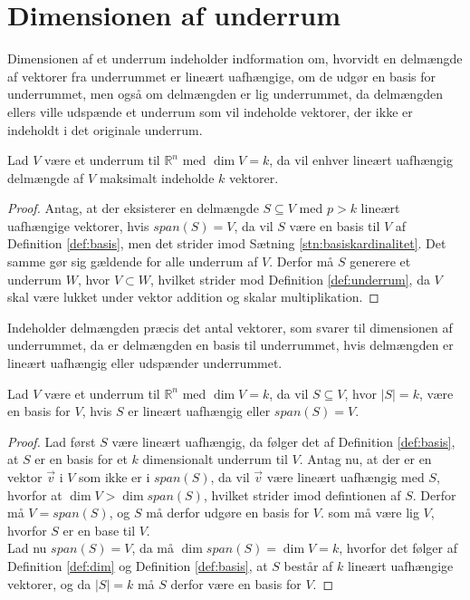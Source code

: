 \section{Dimensionen af underrum}
Dimensionen af et underrum indeholder indformation om, hvorvidt en delmængde af vektorer fra underrummet er lineært uafhængige, om de udgør en basis for underrummet, men også om delmængden er lig underrummet,
da delmængden ellers ville udspænde et underrum som vil indeholde vektorer, der ikke er indeholdt i det originale underrum.
\begin{kor}
Lad $V$ være et underrum til $\mathds{R}^n$ med $\dim{V}=k$, da vil enhver lineært uafhængig delmængde af $V$ maksimalt indeholde $k$ vektorer.
\label{kor:linearuafhangighedunderrum}
\end{kor}
\begin{proof}
Antag, at der eksisterer en delmængde $S \subseteq V$ med $p > k$ lineært uafhængige vektorer, hvis $span(S) = V$, da vil $S$ være en basis til $V$ af Definition \ref{def:basis}, men det strider imod Sætning \ref{stn:basiskardinalitet}. Det samme gør sig gældende for alle underrum af $V$.
Derfor må $S$ generere et underrum $W$, hvor $V \subset W$, hvilket strider mod Definition \ref{def:underrum}, da $V$ skal være lukket under vektor addition og skalar multiplikation.
\end{proof}
Indeholder delmængden præcis det antal vektorer, som svarer til dimensionen af underrummet, da er delmængden en basis til underrummet, hvis delmængden er lineært uafhængig eller udspænder underrummet.
\begin{kor}
Lad $V$ være et underrum til $\mathds{R}^n$ med $\dim{V}=k$, da vil $S \subseteq V$, hvor $|S|=k$, være en basis for $V$, hvis $S$ er lineært uafhængig eller $span(S) = V$.
\label{kor:serbase}
\end{kor}
\begin{proof}
Lad først $S$ være lineært uafhængig, da følger det af Definition \ref{def:basis}, at $S$ er en basis for et $k$ dimensionalt underrum til $V$.
Antag nu, at der er en vektor $\vec{v}$ i $V$ som ikke er i $span(S)$, da vil $\vec{v}$ være lineært uafhængig med $S$, hvorfor at $\dim{V} > \dim{span(S)}$, hvilket strider imod defintionen af $S$. 
Derfor må $V = span(S)$, og $S$ må derfor udgøre en basis for $V$.
 som må være lig $V$, hvorfor $S$ er en base til $V$.
\\Lad nu $span(S) = V$, da må $\dim{span(S)} = \dim{V} = k$, hvorfor det følger af Definition \ref{def:dim} og Definition \ref{def:basis}, at $S$ består af $k$ lineært uafhængige vektorer, og da $|S|=k$ må $S$ derfor være en basis for $V$.
\end{proof}
